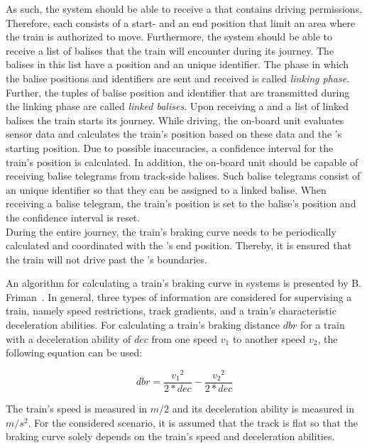 As such, the system should be able to receive a  that contains driving permissions.
Therefore, each  consists of a start- and an end position that limit an area where the train is authorized to move.
Furthermore, the system should be able to receive a list of balises that the train will encounter during its journey.
The balises in this list have a position and an unique identifier.
The phase in which the balise positions and identifiers are sent and received is called \textit{linking phase}.
Further, the tuples of balise position and identifier that are transmitted during the linking phase are called \textit{linked balises}.
Upon receiving a  and a list of linked balises the train starts its journey.
While driving, the on-board unit evaluates sensor data and calculates the train's position based on these data and the 's starting position.
Due to possible inaccuracies, a confidence interval for the train's position is calculated.
In addition, the on-board unit should be capable of receiving balise telegrams from track-side balises.
Such balise telegrams consist of an unique identifier so that they can be assigned to a linked balise.
When receiving a balise telegram, the train's position is set to the balise's position and the confidence interval is reset.
\\

During the entire journey, the train's braking curve needs to be periodically calculated and coordinated with the 's end position.
Thereby, it is ensured that the train will not drive past the 's boundaries.

An algorithm for calculating a train's braking curve in  systems is presented by B. Friman~\cite{CalculateBrakeCurveFriman}.
In general, three types of information are considered for supervising a train, namely speed restrictions, track gradients, and a train's characteristic deceleration abilities.
For calculating a train's braking distance $dbr$ for a train with a deceleration ability of $dec$ from one speed $v_1$ to another speed $v_2$, the following equation can be used:

\begin{equation}
dbr = \frac{{v_1}^2}{2*dec} - \frac{{v_2}^2}{2*dec}
\end{equation}

The train's speed is measured in $m/2$ and its deceleration ability is measured in $m/s^2$.
For the considered scenario, it is assumed that the track is flat so that the braking curve solely depends on the train's speed and deceleration abilities.
\\

